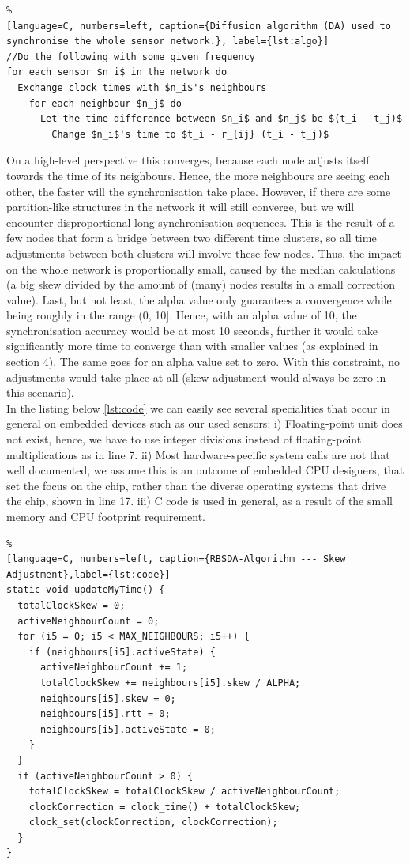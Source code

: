 \documentclass{llncs}
\begin{document}
\begin{lstlisting}%
[language=C, numbers=left, caption={Diffusion algorithm (DA) used to synchronise the whole sensor network.}, label={lst:algo}]
//Do the following with some given frequency
for each sensor $n_i$ in the network do
  Exchange clock times with $n_i$'s neighbours
    for each neighbour $n_j$ do
      Let the time difference between $n_i$ and $n_j$ be $(t_i - t_j)$
        Change $n_i$'s time to $t_i - r_{ij} (t_i - t_j)$
\end{lstlisting}
\noindent On a high-level perspective this converges, because each node adjusts itself towards the time of its neighbours. Hence, the more neighbours are seeing each other, the faster will the synchronisation take place. However, if there are some partition-like structures in the network it will still converge, but we will encounter disproportional long synchronisation sequences. This is the result of a few nodes that form a bridge between two different time clusters, so all time adjustments between both clusters will involve these few nodes. Thus, the impact on the whole network is proportionally small, caused by the median calculations (a big skew divided by the amount of (many) nodes results in a small correction value). Last, but not least, the alpha value only guarantees a convergence while being roughly in the range (0, 10]. Hence, with an alpha value of 10, the synchronisation accuracy would be at most 10 seconds, further it would take significantly more time to converge than with smaller values (as explained in section 4). The same goes for an alpha value set to zero. With this constraint, no adjustments would take place at all (skew adjustment would always be zero in this scenario).\\
\noindent In the listing below \ref{lst:code} we can easily see several specialities that occur in general on embedded devices such as our used sensors: i) Floating-point unit does not exist, hence, we have to use integer divisions instead of floating-point multiplications as in line 7. ii) Most hardware-specific system calls are not that well documented, we assume this is an outcome of embedded CPU designers, that set the focus on the chip, rather than the diverse operating systems that drive the chip, shown in line 17. iii) C code is used in general, as a result of the small memory and CPU footprint requirement.
\begin{lstlisting}%
[language=C, numbers=left, caption={RBSDA-Algorithm --- Skew Adjustment},label={lst:code}]
static void updateMyTime() {
  totalClockSkew = 0;
  activeNeighbourCount = 0;
  for (i5 = 0; i5 < MAX_NEIGHBOURS; i5++) {
    if (neighbours[i5].activeState) {
      activeNeighbourCount += 1;
      totalClockSkew += neighbours[i5].skew / ALPHA;
      neighbours[i5].skew = 0;
      neighbours[i5].rtt = 0;
      neighbours[i5].activeState = 0;
    }
  }
  if (activeNeighbourCount > 0) {
    totalClockSkew = totalClockSkew / activeNeighbourCount;
    clockCorrection = clock_time() + totalClockSkew;
    clock_set(clockCorrection, clockCorrection);
  }
}
\end{lstlisting}
\end{document}
